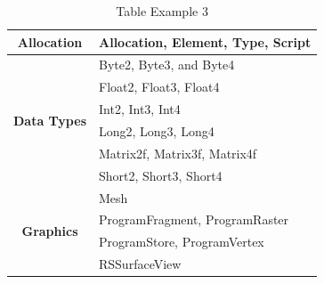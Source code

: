  \begin{table}[htpb]\begin{center}
	\label{t:prefix-table}
	\caption{Table Example 3}
	\renewcommand{\arraystretch}{1.0}
	\begin{tabularx}{300pt}{|c|X| }
		\hline
		\multirow{1}{*}{\textbf{Allocation}} &
		Allocation, Element, Type, Script
		\\ \hline\hline
		\multirow{6}{*}{\textbf{Data Types}} &
        Byte2, Byte3, and Byte4\\ &
        Float2, Float3, Float4\\ &
        Int2, Int3, Int4\\ &
        Long2, Long3, Long4\\ &
        Matrix2f, Matrix3f, Matrix4f\\ &
        Short2, Short3, Short4
        \\ \hline\hline
		\multirow{4}{*}{\textbf{Graphics}} &
		Mesh\\&
		ProgramFragment, ProgramRaster\\&
		ProgramStore, ProgramVertex\\&
		RSSurfaceView
		\\ \hline
	\end{tabularx}
\end{center}\end{table}
